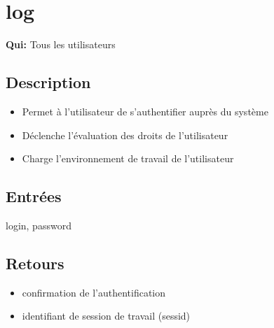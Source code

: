 \newcommand\fatal{(Erreur fatale)}
\newcommand\warning{(message d'avertissement)}
\newcommand\event{u-Événement}
\newcommand\syslog{u-Données d'exploitation}
\newcommand\urt{Responsable technique}
\newcommand\us{Superviseur}
\newcommand\allobjs{u-Aéroport, u-Avion, u-Terminal, u-Hall, u-Chemin de connexion entre les halls, u-Gichet d'enregistrement,
u-Bagage, u-Chariot, u-Rail, u-Zone de contrôle de sécurité automatique, u-Zone de contrôle de sécurité
manuelle, u-Portique, u-Voie de garage, u-Zone de chargement des batteries, u-Zone embarquement, u-Tapis roulant,
u-Train, u-Wagonnet, u-Container, u-Plateau élévateur, u-Zone de déchargement, u-Tobogan, u-Zone de retrait des bagages,
u-Carrousel, u-Zone de maintenance, u-Aiguillage, u-Chemin de roulement, u-Événement, u-Données d'exploitation}
\newcommand\circobjs{u-Zone*, u-Bagage, u-Chariot, u-Voie de garage, u-Tapis roulant, u-Train, u-Rail, u-Wagonnet, u-Container,
u-Plateau Élévateur, u-Tobogan, u-Carrousel, u-Aiguillage, u-Chemin de roulement}
\newcommand\autobjs{u-Guichet d'enregistrement, u-Chariot, u-Portique, u-Tapis roulant, u-Train, u-Plateau élévateur, u-Tobogan,
u-Carrousel, u-Chemin de roulement, \event}

\section{log}
	\textbf{Qui:} Tous les utilisateurs

	\subsection{Description}
	\begin{itemize}
		\item Permet à l'utilisateur de s'authentifier auprès du système
		\item Déclenche l'évaluation des droits de l'utilisateur
		\item Charge l'environnement de travail de l'utilisateur
	\end{itemize}

	\subsection{Entrées}
		login, password

	\subsection{Retours}
	\begin{itemize}
		\item confirmation de l'authentification
		\item identifiant de session de travail (sessid)
	\end{itemize}

